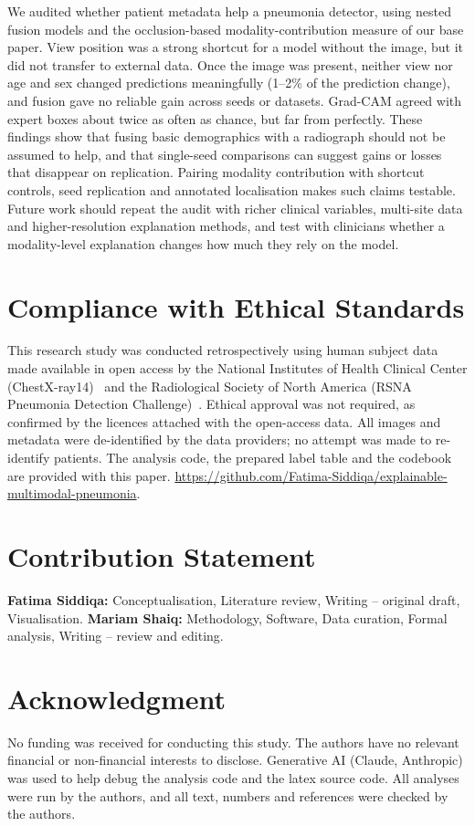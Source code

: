 \documentclass[conference]{IEEEtran}
\begin{document}
We audited whether patient metadata help a pneumonia detector, using nested fusion models and the occlusion-based modality-contribution measure of our base paper. View position was a strong shortcut for a model without the image, but it did not transfer to external data. Once the image was present, neither view nor age and sex changed predictions meaningfully (1--2\% of the prediction change), and fusion gave no reliable gain across seeds or datasets. Grad-CAM agreed with expert boxes about twice as often as chance, but far from perfectly. These findings show that fusing basic demographics with a radiograph should not be assumed to help, and that single-seed comparisons can suggest gains or losses that disappear on replication. Pairing modality contribution with shortcut controls, seed replication and annotated localisation makes such claims testable. Future work should repeat the audit with richer clinical variables, multi-site data and higher-resolution explanation methods, and test with clinicians whether a modality-level explanation changes how much they rely on the model.

\section{Compliance with Ethical Standards}
\label{sec:ethics}
This research study was conducted retrospectively using human subject data made available in open access by the National Institutes of Health Clinical Center (ChestX-ray14)~\cite{wang2017chestxray8} and the Radiological Society of North America (RSNA Pneumonia Detection Challenge)~\cite{shih2019rsna}. Ethical approval was not required, as confirmed by the licences attached with the open-access data. All images and metadata were de-identified by the data providers; no attempt was made to re-identify patients. The analysis code, the prepared label table and the codebook are provided with this paper.
\url{https://github.com/Fatima-Siddiqa/explainable-multimodal-pneumonia}.

\section*{Contribution Statement}
\textbf{Fatima Siddiqa:} Conceptualisation, Literature review, Writing -- original draft, Visualisation. \textbf{Mariam Shaiq:} Methodology, Software, Data curation, Formal analysis, Writing -- review and editing.

\section*{Acknowledgment}
No funding was received for conducting this study. The authors have no relevant financial or non-financial interests to disclose. Generative AI (Claude, Anthropic) was used to help debug the analysis code and the latex source code. All analyses were run by the authors, and all text, numbers and references were checked by the authors.


\end{document}
